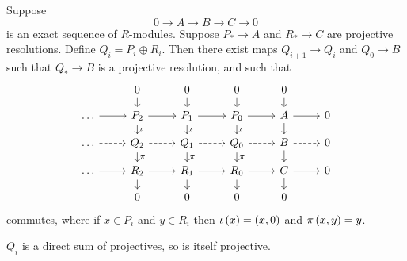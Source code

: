 \begin{proposition}
Suppose
$$ 0 \to A \to B \to C \to 0 $$
is an exact sequence of $ R $-modules. Suppose $ P_* \to A $ and $ R_* \to C $ are projective resolutions. Define $ Q_i = P_i \oplus R_i $. Then there exist maps $ Q_{i + 1} \to Q_i $ and $ Q_0 \to B $ such that $ Q_* \to B $ is a projective resolution, and such that
$$
\begin{tikzcd}[row sep=small]
& 0 \arrow{d} & 0 \arrow{d} & 0 \arrow{d} & 0 \arrow{d} & \\
\dots \arrow{r} & P_2 \arrow{r} \arrow{d}{\iota} & P_1 \arrow{r} \arrow{d}{\iota} & P_0 \arrow{r} \arrow{d}{\iota} & A \arrow{r} \arrow{d} & 0 \\
\dots \arrow[dashed]{r} & Q_2 \arrow[dashed]{r} \arrow{d}{\pi} & Q_1 \arrow[dashed]{r} \arrow{d}{\pi} & Q_0 \arrow[dashed]{r} \arrow{d}{\pi} & B \arrow[dashed]{r} \arrow{d} & 0 \\
\dots \arrow{r} & R_2 \arrow{r} \arrow{d} & R_1 \arrow{r} \arrow{d} & R_0 \arrow{r} \arrow{d} & C \arrow{r} \arrow{d} & 0 \\
& 0 & 0 & 0 & 0 &
\end{tikzcd}
$$
commutes, where if $ x \in P_i $ and $ y \in R_i $ then $ \iota\br{x} = \br{x, 0} $ and $ \pi\br{x, y} = y $.
\end{proposition}

\begin{note*}
$ Q_i $ is a direct sum of projectives, so is itself projective.
\end{note*}


